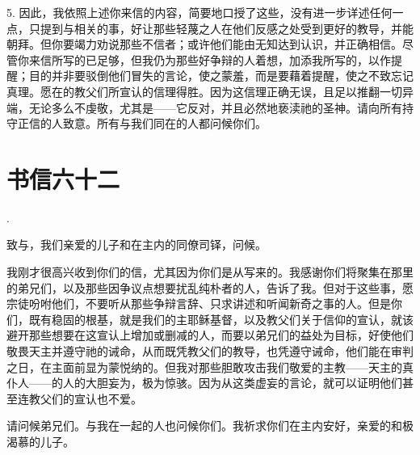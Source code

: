 5. 因此，我依照上述你来信的内容，简要地口授了这些，没有进一步详述任何一点，只提到与相关的事，好让那些轻蔑之人在他们反感之处受到更好的教导，并能朝拜。但你要竭力劝说那些不信者；或许他们能由无知达到认识，并正确相信。尽管你来信所写的已足够，但我仍为那些好争辩的人着想，加添我所写的，以作提醒；目的并非要驳倒他们冒失的言论，使之蒙羞，而是要藉着提醒，使之不致忘记真理。愿在的教父们所宣认的信理得胜。因为这信理正确无误，且足以推翻一切异端，无论多么不虔敬，尤其是——它反对，并且必然地亵渎祂的圣神。请向所有持守正信的人致意。所有与我们同在的人都问候你们。\par



\section{书信六十二}

.\par

致与，我们亲爱的儿子和在主内的同僚司铎，问候。\par

我刚才很高兴收到你们的信，尤其因为你们是从写来的。我感谢你们将聚集在那里的弟兄们，以及那些因争议点想要扰乱纯朴者的人，告诉了我。但对于这些事，愿宗徒吩咐他们，不要听从那些争辩言辞、只求讲述和听闻新奇之事的人。但是你们，既有稳固的根基，就是我们的主耶稣基督，以及教父们关于信仰的宣认，就该避开那些想要在这宣认上增加或删减的人，而要以弟兄们的益处为目标，好使他们敬畏天主并遵守祂的诫命，从而既凭教父们的教导，也凭遵守诫命，他们能在审判之日，在主面前显为蒙悦纳的。但我对那些胆敢攻击我们敬爱的主教——天主的真仆人——的人的大胆妄为，极为惊骇。因为从这类虚妄的言论，就可以证明他们甚至连教父们的宣认也不爱。\par

请问候弟兄们。与我在一起的人也问候你们。我祈求你们在主内安好，亲爱的和极渴慕的儿子。\par


